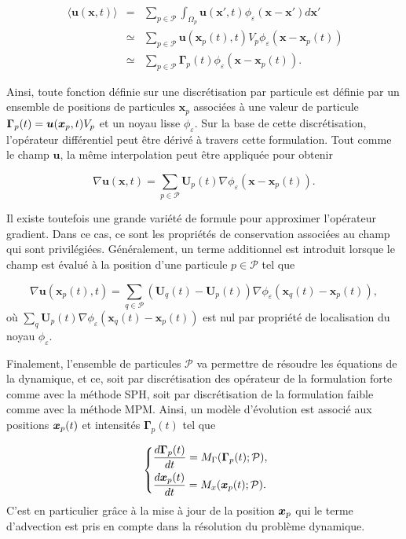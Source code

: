 \begin{eqnarray*}~\label{eq:part_approx}
    \langle \bm{u}(\bm{x}, t) \rangle &=& \sum_{p \in \mathcal P} \int_{\Omega_p} \bm{u}(\bm{x}', t) \phi_\varepsilon(\bm{x}-\bm{x}') d\bm{x}' \\
    &\simeq& \sum_{p \in \mathcal P} \bm{u}(\bm{x}_p(t), t) V_p \phi_\varepsilon (\bm{x}-\bm{x}_p(t)) \\
    &\simeq& \sum_{p \in \mathcal P} \bm{\Gamma}_p(t) \phi_\varepsilon (\bm{x}-\bm{x}_p(t)).
\end{eqnarray*}

Ainsi, toute fonction définie sur une discrétisation par particule est définie par un ensemble de positions de particules $\bm{x}_p$ associées à une valeur de particule $\bm{\Gamma}_p(t) = \bm{u}(\bm{x}_p, t) V_p$ et un noyau lisse $\phi_\varepsilon$. Sur la base de cette discrétisation, l'opérateur différentiel peut être dérivé à travers cette formulation. Tout comme le champ $\bm u$, la même interpolation peut être appliquée pour obtenir

\begin{equation*}
    \nabla \bm{u}(\bm{x}, t) = \sum_{p \in \mathcal P} \bm{U}_p(t) \nabla \phi_\varepsilon (\bm{x}-\bm{x}_p(t)).
\end{equation*}

Il existe toutefois une grande variété de formule pour approximer l'opérateur gradient. Dans ce cas, ce sont les propriétés de conservation associées au champ qui sont privilégiées.
Généralement, un terme additionnel est introduit lorsque le champ est évalué à la position d'une particule $p \in \mathcal P$ tel que

\begin{equation*}
    \nabla \bm{u}(\bm{x}_p(t), t) = \sum_{q \in \mathcal P} (\bm{U}_q(t) - \bm{U}_p(t)) \nabla \phi_\varepsilon (\bm{x}_q(t)-\bm{x}_p(t)),
\end{equation*}où $\sum_q \bm{U}_p(t) \nabla \phi_\varepsilon (\bm{x}_q(t)-\bm{x}_p(t))$ est nul par propriété de localisation du noyau $\phi_\varepsilon$.

Finalement, l'ensemble de particules $\mathcal P$ va permettre de résoudre les équations de la dynamique, et ce, soit par discrétisation des opérateur de la formulation forte comme avec la méthode SPH, soit par discrétisation de la formulation faible comme avec la méthode MPM. Ainsi, un modèle d'évolution est associé aux positions $\bm{x}_p(t)$ et intensités $\bm \Gamma_p(t)$ tel que

\begin{gather}~\label{eq:model_evol}
    \left\{\begin{aligned}
         & \frac{d\bm \Gamma_p(t)}{dt} = M_\Gamma(\bm \Gamma_p(t); \mathcal P), \\
         & \frac{d \bm{x}_p(t)}{d t} = M_x(\bm{x}_p(t); \mathcal P).
    \end{aligned} \right.
\end{gather}C'est en particulier grâce à la mise à jour de la position $\bm{x}_p$ qui le terme d'advection est pris en compte dans la résolution du problème dynamique.

